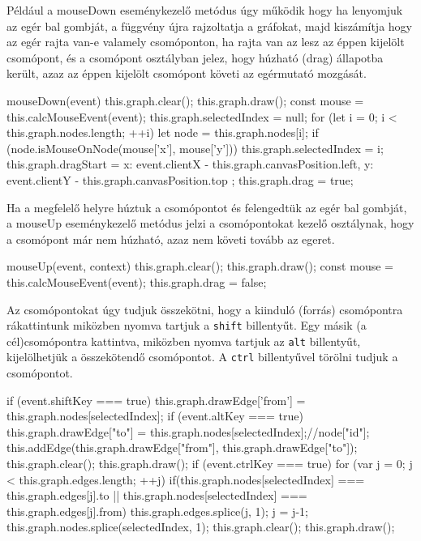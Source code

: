 Például a mouseDown eseménykezelő metódus úgy működik hogy ha lenyomjuk az egér bal gombját, a függvény újra rajzoltatja a gráfokat, majd kiszámítja hogy az egér rajta van-e valamely csomóponton, ha rajta van az lesz az éppen kijelölt csomópont, és a csomópont osztályban jelez, hogy húzható (drag) állapotba került, azaz az éppen kijelölt csomópont követi az egérmutató mozgását.

\begin{javascript}
mouseDown(event)
{
   this.graph.clear();
   this.graph.draw();
   const mouse = this.calcMouseEvent(event);
   this.graph.selectedIndex = null;
   for (let i = 0; i < this.graph.nodes.length; ++i) {
       let node = this.graph.nodes[i];
       if (node.isMouseOnNode(mouse['x'], mouse['y'])){
           this.graph.selectedIndex = i;
       }
   }
   this.graph.dragStart = {
       x: event.clientX - this.graph.canvasPosition.left,
       y: event.clientY - this.graph.canvasPosition.top
   };
   this.graph.drag = true;
}
\end{javascript}

 
Ha a megfelelő helyre húztuk a csomópontot és felengedtük az egér bal gombját, a mouseUp eseménykezelő metódus jelzi a csomópontokat kezelő osztálynak, hogy a csomópont már nem húzható, azaz nem követi tovább az egeret.

\begin{javascript}
mouseUp(event, context)
{
   this.graph.clear();
   this.graph.draw();
   const mouse = this.calcMouseEvent(event);
   this.graph.drag = false;
}
\end{javascript}

Az csomópontokat úgy tudjuk összekötni, hogy a kiinduló (forrás) csomópontra rákattintunk miközben nyomva tartjuk a \texttt{shift} billentyűt. Egy másik (a cél)csomópontra kattintva, miközben nyomva tartjuk az \texttt{alt} billentyűt, kijelölhetjük a összekötendő csomópontot. A \texttt{ctrl} billentyűvel törölni tudjuk a csomópontot.

\begin{javascript}
if (event.shiftKey === true) {
   this.graph.drawEdge['from'] = this.graph.nodes[selectedIndex];
}
if (event.altKey === true) {
   this.graph.drawEdge["to"] = this.graph.nodes[selectedIndex];//node["id"];
   this.addEdge(this.graph.drawEdge["from"], this.graph.drawEdge["to"]);
   this.graph.clear();
   this.graph.draw();
}
if (event.ctrlKey === true) {
   for (var j = 0; j < this.graph.edges.length; ++j) {
       if(this.graph.nodes[selectedIndex] === this.graph.edges[j].to || this.graph.nodes[selectedIndex] === this.graph.edges[j].from)
       {
           this.graph.edges.splice(j, 1);
           j = j-1;
       }
   }
   this.graph.nodes.splice(selectedIndex, 1);
   this.graph.clear();
   this.graph.draw();
}
\end{javascript}

